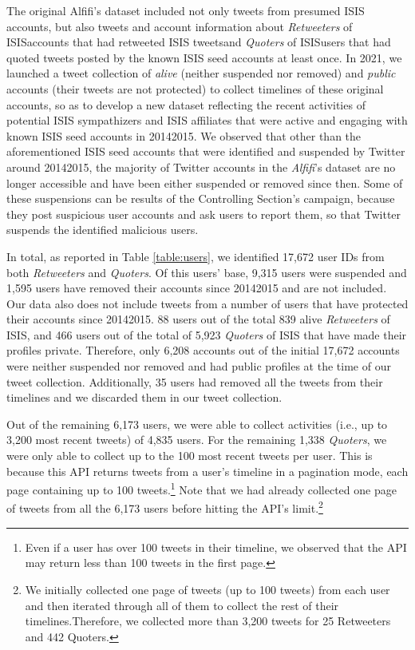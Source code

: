 \documentclass[letterpaper]{article}
\begin{document}
The original Alfifi's dataset included not only tweets from presumed  ISIS  accounts, but also tweets and account information about {\em Retweeters} of ISISaccounts that had retweeted ISIS tweetsand {\em Quoters} of ISISusers that had quoted tweets posted by the known ISIS seed accounts at least once. In 2021,  we launched  a tweet collection of  \textit{alive} (neither suspended nor removed) and {\em public} accounts (their tweets are not protected) to collect timelines of these original accounts, so as to develop a new dataset reflecting the recent activities of potential ISIS sympathizers and ISIS affiliates that were active and engaging with known ISIS seed accounts in 20142015. We observed that other than the aforementioned ISIS seed accounts that were identified and suspended by Twitter around 20142015, the majority of  Twitter accounts in the \textit{Alfifi}'s dataset are no longer accessible and have been either suspended or removed since then. Some of these suspensions can be results of the Controlling Section's campaign, because they post suspicious user accounts and ask users to report them, so that Twitter suspends the identified malicious users.

In total, as reported in Table \ref{table:users}, we identified  17,672 user IDs from both \textit{Retweeters} and \textit{Quoters}. Of this users' base,  9,315 users were  suspended and 1,595 users have removed their accounts since 20142015 and are not included. Our data  also does not include  tweets from  a  number of   users that have protected their accounts since 20142015.  88 users out of the total 839 alive \textit{Retweeters} of ISIS, and 466 users out of the total of 5,923 \textit{Quoters} of ISIS that have made their profiles private. Therefore, only 6,208 accounts out of the initial 17,672 accounts were neither suspended nor removed and had public profiles at the time of our tweet collection. Additionally, 35 users had removed all the tweets from their timelines and we discarded them in our tweet collection.

Out of the remaining 6,173 users, we were able to collect  activities (i.e., up to 3,200 most recent tweets) of 4,835 users. For the remaining 1,338 \textit{Quoters}, we were only able to collect up to the 100 most recent tweets per user. This is because this API returns tweets from a user's timeline in a pagination mode, each page containing up to 100 tweets.\footnote{Even if a user has over 100 tweets in their timeline, we observed that the API may return less than 100 tweets in the first page.}  Note that we had already collected one page of tweets from all the 6,173 users before hitting the API's limit.\footnote{We initially collected one page of tweets (up to 100 tweets) from each user and then iterated through all of them to collect the rest of their timelines.Therefore, we collected more than 3,200  tweets for 25 Retweeters and 442 Quoters.}
\end{document}
